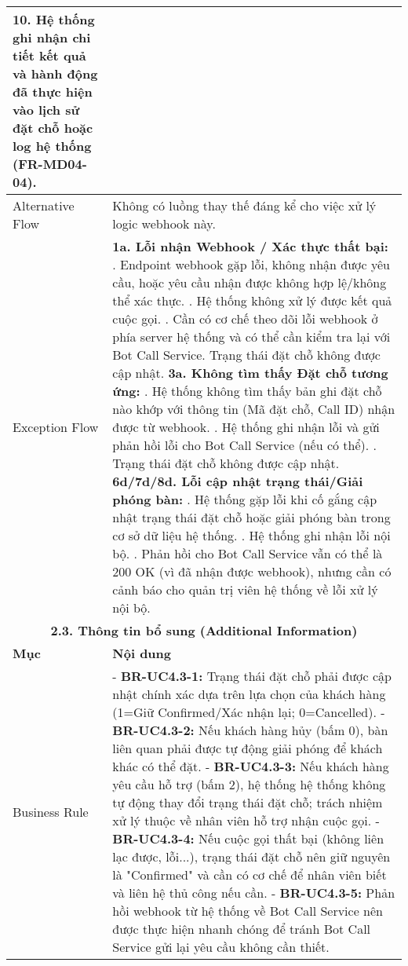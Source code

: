 \begin{longtable}{|m{4cm}|p{11cm}|}
10. Hệ thống ghi nhận chi tiết kết quả và hành động đã thực hiện vào lịch sử đặt chỗ hoặc log hệ thống (FR-MD04-04). \\
\hline
Alternative Flow & Không có luồng thay thế đáng kể cho việc xử lý logic webhook này. \\
\hline
Exception Flow & \textbf{1a. Lỗi nhận Webhook / Xác thực thất bại:} \newline    1. Endpoint webhook gặp lỗi, không nhận được yêu cầu, hoặc yêu cầu nhận được không hợp lệ/không thể xác thực. \newline    2. Hệ thống không xử lý được kết quả cuộc gọi. \newline    3. Cần có cơ chế theo dõi lỗi webhook ở phía server hệ thống và có thể cần kiểm tra lại với Bot Call Service. Trạng thái đặt chỗ không được cập nhật. \newline \textbf{3a. Không tìm thấy Đặt chỗ tương ứng:} \newline    1. Hệ thống không tìm thấy bản ghi đặt chỗ nào khớp với thông tin (Mã đặt chỗ, Call ID) nhận được từ webhook. \newline    2. Hệ thống ghi nhận lỗi và gửi phản hồi lỗi cho Bot Call Service (nếu có thể). \newline    3. Trạng thái đặt chỗ không được cập nhật. \newline \textbf{6d/7d/8d. Lỗi cập nhật trạng thái/Giải phóng bàn:} \newline    1. Hệ thống gặp lỗi khi cố gắng cập nhật trạng thái đặt chỗ hoặc giải phóng bàn trong cơ sở dữ liệu hệ thống. \newline    2. Hệ thống ghi nhận lỗi nội bộ. \newline    3. Phản hồi cho Bot Call Service vẫn có thể là 200 OK (vì đã nhận được webhook), nhưng cần có cảnh báo cho quản trị viên hệ thống về lỗi xử lý nội bộ. \\
\hline
\multicolumn{2}{|c|}{\textbf{2.3. Thông tin bổ sung (Additional Information)}} \\
\hline
\textbf{Mục} & \textbf{Nội dung} \\
\hline
Business Rule & - \textbf{BR-UC4.3-1:} Trạng thái đặt chỗ phải được cập nhật chính xác dựa trên lựa chọn của khách hàng (1=Giữ Confirmed/Xác nhận lại; 0=Cancelled). \newline - \textbf{BR-UC4.3-2:} Nếu khách hàng hủy (bấm 0), bàn liên quan phải được tự động giải phóng để khách khác có thể đặt. \newline - \textbf{BR-UC4.3-3:} Nếu khách hàng yêu cầu hỗ trợ (bấm 2), hệ thống hệ thống không tự động thay đổi trạng thái đặt chỗ; trách nhiệm xử lý thuộc về nhân viên hỗ trợ nhận cuộc gọi. \newline - \textbf{BR-UC4.3-4:} Nếu cuộc gọi thất bại (không liên lạc được, lỗi...), trạng thái đặt chỗ nên giữ nguyên là "Confirmed" và cần có cơ chế để nhân viên biết và liên hệ thủ công nếu cần. \newline - \textbf{BR-UC4.3-5:} Phản hồi webhook từ hệ thống về Bot Call Service nên được thực hiện nhanh chóng để tránh Bot Call Service gửi lại yêu cầu không cần thiết. \\

\end{longtable}
